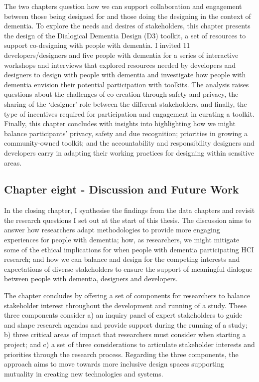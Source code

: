 The two chapters question how we can support collaboration and engagement between those being designed for and those doing the designing in the context of dementia. To explore the needs and desires of stakeholders, this chapter presents the design of the Dialogical Dementia Design (D3) toolkit, a set of resources to support co-designing with people with dementia. I invited 11 developers/designers and five people with dementia for a series of interactive workshops and interviews that explored resources needed by developers and designers to design with people with dementia and investigate how people with dementia envision their potential participation with toolkits. The analysis raises questions about the challenges of co-creation through safety and privacy, the sharing of the ‘designer’ role between the different stakeholders, and finally, the type of incentives required for participation and engagement in curating a toolkit. Finally, this chapter concludes with insights into highlighting how we might balance participants' privacy, safety and due recognition; priorities in growing a community-owned toolkit; and the accountability and responsibility designers and developers carry in adapting their working practices for designing within sensitive areas.
\subsection{Chapter eight - Discussion and Future Work}
\label{Intro:ChapterEight}
In the closing chapter, I synthesise the findings from the data chapters and revisit the research questions I set out at the start of this thesis. The discussion aims to answer how researchers adapt methodologies to provide more engaging experiences for people with dementia; how, as researchers, we might mitigate some of the ethical implications for when people with dementia participating HCI research; and how we can balance and design for the competing interests and expectations of diverse stakeholders to ensure the support of meaningful dialogue between people with dementia, designers and developers. 

The chapter concludes by offering a set of components for researchers to balance stakeholder interest throughout the development and running of a study. These three components consider a) an inquiry panel of expert stakeholders to guide and shape research agendas and provide support during the running of a study; b) three critical areas of impact that researchers must consider when starting a project; and c) a set of three considerations to articulate stakeholder interests and priorities through the research process. Regarding the three components, the approach aims to move towards more inclusive design spaces supporting mutuality in creating new technologies and systems.


